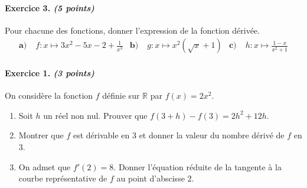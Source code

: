 \documentclass[11pt]{article}
\begin{document}
\paragraph{Exercice 3. \emph{(5 points)}}
Pour chacune des fonctions, donner l'expression de la fonction
dérivée.
\begin{align*}
  \textbf{a)}\; & f:x\mapsto 3x^2-5x-2+\frac{1}{x^3} &
  \textbf{b)}\; & g:x\mapsto x^2(\sqrt x+1) &
  \textbf{c)}\; & h:x\mapsto \frac{1-x}{x^2+1} 
\end{align*}
\vspace{1.5cm}
\paragraph{Exercice 1. \emph{(3 points)}} On considère la fonction $f$ définie sur $\mathbb{R}$
par $f(x)=2x^2$.
\begin{enumerate}
  \item Soit $h$ un réel non nul. Prouver que $f(3+h)-f(3)=2h^2+12h$.
  \item Montrer que $f$ est dérivable en $3$ et donner la valeur du nombre
    dérivé de $f$ en $3$.
  \item On admet que $f'(2)=8$. Donner l'équation réduite de la tangente à la courbe
    représentative de $f$ au point d'abscisse $2$.
\end{enumerate}
\end{document}
